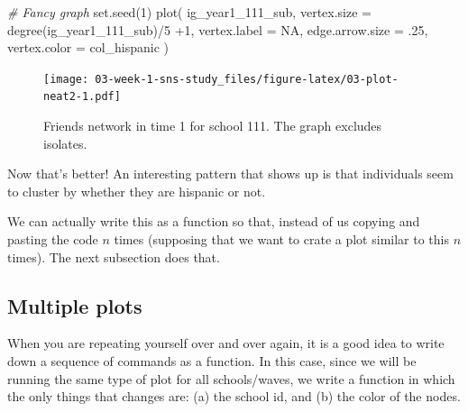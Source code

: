 \documentclass[
]{book}
\newenvironment{Shaded}{\begin{snugshade}}{\end{snugshade}}
\newcommand{\AttributeTok}[1]{\textcolor[rgb]{0.77,0.63,0.00}{#1}}
\newcommand{\CommentTok}[1]{\textcolor[rgb]{0.56,0.35,0.01}{\textit{#1}}}
\newcommand{\ConstantTok}[1]{\textcolor[rgb]{0.00,0.00,0.00}{#1}}
\newcommand{\DecValTok}[1]{\textcolor[rgb]{0.00,0.00,0.81}{#1}}
\newcommand{\FunctionTok}[1]{\textcolor[rgb]{0.00,0.00,0.00}{#1}}
\newcommand{\NormalTok}[1]{#1}
\newcommand{\SpecialCharTok}[1]{\textcolor[rgb]{0.00,0.00,0.00}{#1}}
\begin{document}
\begin{Shaded}
\begin{Highlighting}[]
\CommentTok{\# Fancy graph}
\FunctionTok{set.seed}\NormalTok{(}\DecValTok{1}\NormalTok{)}
\FunctionTok{plot}\NormalTok{(}
\NormalTok{  ig\_year1\_111\_sub,}
  \AttributeTok{vertex.size     =} \FunctionTok{degree}\NormalTok{(ig\_year1\_111\_sub)}\SpecialCharTok{/}\DecValTok{5} \SpecialCharTok{+}\DecValTok{1}\NormalTok{,}
  \AttributeTok{vertex.label    =} \ConstantTok{NA}\NormalTok{,}
  \AttributeTok{edge.arrow.size =}\NormalTok{ .}\DecValTok{25}\NormalTok{,}
  \AttributeTok{vertex.color    =}\NormalTok{ col\_hispanic}
\NormalTok{  )}
\end{Highlighting}
\end{Shaded}

\begin{figure}
\centering
\texttt{[image: 03-week-1-sns-study\_files/figure-latex/03-plot-neat2-1.pdf]}
\caption{\label{fig:03-plot-neat2}Friends network in time 1 for school 111. The graph excludes isolates.}
\end{figure}

Now that's better! An interesting pattern that shows up is that individuals seem to cluster by whether they are hispanic or not.

We can actually write this as a function so that, instead of us copying and pasting the code \(n\) times (supposing that we want to crate a plot similar to this \(n\) times). The next subsection does that.

\hypertarget{multiple-plots}{%
\subsection{Multiple plots}\label{multiple-plots}}

When you are repeating yourself over and over again, it is a good idea to write down a sequence of commands as a function. In this case, since we will be running the same type of plot for all schools/waves, we write a function in which the only things that changes are: (a) the school id, and (b) the color of the nodes.
\end{document}
